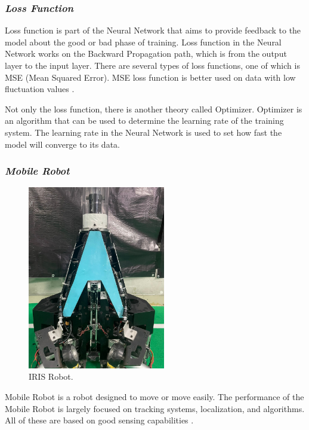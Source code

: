 \subsubsection{\emph{Loss Function}}
\label{sec:loss_function}

Loss function is part of the Neural Network that aims to provide feedback to the model about the good or bad phase of training. Loss function in the Neural Network works on the Backward Propagation path, which is from the output layer to the input layer. There are several types of loss functions, one of which is MSE (Mean Squared Error). MSE loss function is better used on data with low fluctuation values \citet{ref_loss_function}.

Not only the loss function, there is another theory called Optimizer. Optimizer is an algorithm that can be used to determine the learning rate of the training system. The learning rate in the Neural Network is used to set how fast the model will converge to its data.

\subsubsection{\emph{Mobile Robot}}
\label{sec:mobile_robot}
\begin{figure}[ht]
    \centering
  
    \includegraphics[width=6cm]{gambar/iris1.jpeg}
  
    \caption{IRIS Robot.}
    \label{fig:mobile_robot}
\end{figure}
Mobile Robot is a robot designed to move or move easily. The performance of the Mobile Robot is largely focused on tracking systems, localization, and algorithms. All of these are based on good sensing capabilities \citet{ref_mobile_robot}.


